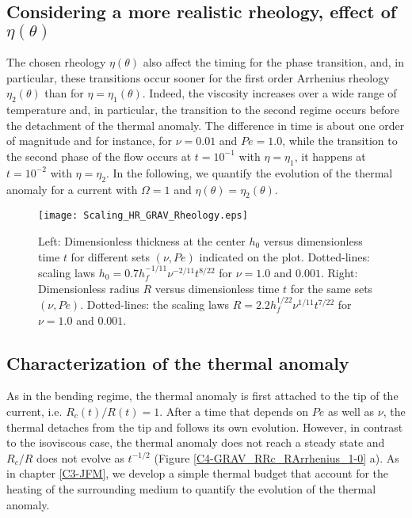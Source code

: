 \subsection{Considering   a  more   realistic   rheology,  effect   of
  $\eta(\theta)$}
\label{C4-sec:cons-more-real-1}
 
The  chosen rheology  $\eta(\theta)$ also  affect the  timing for  the
phase transition,  and, in particular, these  transitions occur sooner
for  the  first order  Arrhenius  rheology  $\eta_2(\theta)$ than  for
$\eta=\eta_1(\theta)$.  Indeed,  the viscosity  increases over  a wide
range of temperature and, in  particular, the transition to the second
regime  occurs before  the  detachment of  the  thermal anomaly.   The
difference in time  is about one order of magnitude  and for instance,
for $\nu=0.01$ and $Pe=1.0$, while  the transition to the second phase
of the  flow occurs at  $t=10^{-1}$ with $\eta=\eta_1$, it  happens at
$t=10^{-2}$  with $\eta=\eta_2$.   In the  following, we  quantify the
evolution of  the thermal  anomaly for a  current with  $\Omega=1$ and
$\eta(\theta)=\eta_2(\theta)$.

\begin{figure}[htpb]
  \begin{center}
    \graphicspath{ {/Users/thorey/Documents/These/Projet/Refroidissement/Skin_Model/Figure/Figure_Heating/} }
    \texttt{[image: Scaling\_HR\_GRAV\_Rheology.eps]}
    \caption{Left: Dimensionless thickness at  the center $h_0$ versus
      dimensionless time  $t$ for different sets  $(\nu,Pe)$ indicated
      on      the      plot.      Dotted-lines:      scaling      laws
      $h_0=  0.7h_f^{-1/11}\nu^{-2/11}t^{8/22}$ for  $\nu  = 1.0$  and
      $0.001$.  Right:  Dimensionless radius $R$  versus dimensionless
      time  $t$  for  the  same sets  $(\nu,Pe)$.   Dotted-lines:  the
      scaling    laws    $R=   2.2h_f^{1/22}\nu^{1/11}t^{7/22}$    for
      $\nu = 1.0$ and $0.001$.}
    \label{C4-HR_GRAV_Rheology}
  \end{center}
\end{figure}

\subsection{Characterization of the thermal anomaly}
\label{C4-sec:char-therm-anom-2}

As in the bending regime, the thermal anomaly is first attached to the
tip of the current, i.e. $R_c(t)/R(t)=1$. After a time that depends on
$Pe$ as well  as $\nu$, the thermal detaches from  the tip and follows
its own  evolution. However, in  contrast to the isoviscous  case, the
thermal anomaly  does not reach  a steady  state and $R_c/R$  does not
evolve as  $t^{-1/2}$ (Figure \ref{C4-GRAV_RRc_RArrhenius_1-0}  a). As
in  chapter \ref{C3-JFM},  we  develop a  simple  thermal budget  that
account  for the  heating of  the surrounding  medium to  quantify the
evolution of the thermal anomaly.

